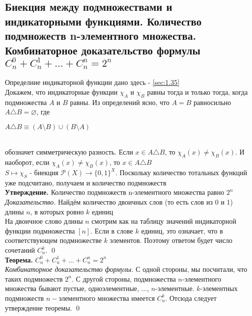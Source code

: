 \documentclass[a4paper]{article}
\begin{document}
\subsection{Биекция между подмножествами и индикаторными функциями. Количество подмножеств n-элементного множества. Комбинаторное доказательство формулы $C^0_n+C^1_n+\ldots+C^n_n=2^n$}
Определние индикаторной функции дано здесь -  \ref{sec:1.35}\\[2mm]
 Докажем, что индикаторные функции $\chi_A$ и $\chi_B$ равны тогда и только тогда, когда подмножества $A$ и $B$ равны. Из определений ясно, что $A = B$ равносильно $A\triangle B=\varnothing$, где\\[2mm]
\centerline{$A\triangle B\equiv(A\setminus B)\cup(B\setminus A)$}\\[2mm]
обозначет симметрическую разность. Если $x\in A\triangle B$, то $\chi_A(x)\ne\chi_B(x)$. И наоборот, если $\chi_A(x)\ne\chi_B(x)$, то $x\in A\triangle B$\\[2mm]
 $S\mapsto\chi_S$ - биекция $\mathcal{P}(X)\rightarrow\{0,1\}^X$. Поскольку количество тотальных функций уже подсчитано, получаем и количество подмножеств\\[2mm]
\textbf{Утверждение.} Количество подмножеств n-элементного множества равно $2^n$\\[2mm]
\textit{Доказательство.} Найдём количество двоичных слов (то есть слов из 0 и 1) длины $n$, в которых ровно $k$ единиц\\[2mm]
 На двоичное слово длины $n$ смотрим как на таблицу значений индикаторной функции подмножества $[n]$. Если в слове $k$ единиц, это означает, что в соответствующем подмножестве $k$ элементов. Поэтому ответом будет число сочетаний $C_n^k$. \qed\\[2mm]
\textbf{Теорема.} $C^0_n+C^1_n+\ldots+C^n_n=2^n$\\[2mm]
\textit{Комбинаторное доказательство формулы.} С одной стороны, мы посчитали, что таких подмножеств $2^n$. С другой стороны, подмножества $n$-элементного множества бывают пустые, одноэлементные, ..., $n$-элементные. $k$-элементных подмножеств $n-$элементного множества имеется $C_n^k$. Отсюда следует утверждение теоремы. \qed
\end{document}
